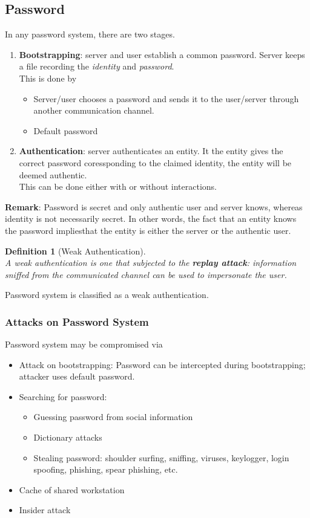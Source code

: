 \documentclass[12pt]{article}
\newtheorem{definition}{Definition}[section]
\theoremstyle{definition}
\begin{document}
\subsection{Password}
In any password system, there are two stages.
\begin{enumerate}
  \item \textbf{Bootstrapping}: server and user establish a common password. Server keeps a file recording the \textit{identity} and \textit{password}.\\
  This is done by \begin{itemize}
  \item Server/user chooses a password and sends it to the user/server through another communication channel.
  \item Default password
\end{itemize}
  \item \textbf{Authentication}: server authenticates an entity. It the entity gives the correct password coressponding to the claimed identity, the entity will be deemed authentic.\\
  This can be done either with or without interactions. 
\end{enumerate}
\textbf{Remark}: Password is secret and only authentic user and server knows, whereas identity is not necessarily secret. In other words, the fact that an entity knows the password impliesthat the entity is either the server or the authentic user.
\begin{definition}[Weak Authentication]
\hfill\\\normalfont A weak authentication is one that subjected to the \textbf{replay attack}: information sniffed from the communicated channel can be used to impersonate the user.
\end{definition}
Password system is classified as a weak authentication.
\subsubsection{Attacks on Password System}
Password system may be compromised via
\begin{itemize}
  \item Attack on bootstrapping: Password can be intercepted during bootstrapping; attacker uses default password.
  \item Searching for password:
  \begin{itemize}
    \item Guessing password from social information
    \item Dictionary attacks
    \item Stealing password: shoulder surfing, sniffing, viruses, keylogger, login spoofing, phishing, spear phishing, etc.
  \end{itemize}
  \item Cache of shared workstation
  \item Insider attack
\end{itemize}
\end{document}
